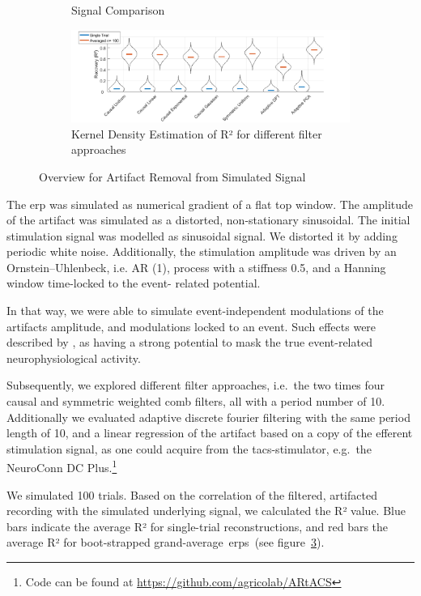 \documentclass[a4paper]{article}
\newcommand{\figref}[1]{(see figure~\ref{#1})}
\begin{document}
\begin{figure}[hbtp]
\begin{subfigure}{0.75\textwidth}
\begin{subfigure}{.45\textwidth}
        \end{subfigure}
    \caption{Signal Comparison}\label{fig:simRaw}
    \end{subfigure}
    \begin{subfigure}{1.0\textwidth}
        \includegraphics[width=\textwidth]{img/eva/sim_R2.png}
        \caption{Kernel Density Estimation of R² for different filter approaches}\label{fig:simR2}
    \end{subfigure}
    \caption{Overview for Artifact Removal from  Simulated Signal}
\end{figure}


The \gls{erp} was simulated as numerical gradient of a flat top window.
The amplitude of the artifact was simulated as a distorted, non-stationary sinusoidal. The initial stimulation signal was modelled as sinusoidal signal. We distorted it by adding periodic white noise. Additionally, the stimulation amplitude was driven by an Ornstein–Uhlenbeck, i.e. AR (1), process with a stiffness 0.5, and a Hanning window time-locked to the event- related potential.

In that way, we were able to simulate event-independent modulations of the artifacts amplitude, and modulations locked to an event. Such effects were described by \citep{Noury_2016}, as having a strong potential to mask the true event-related neurophysiological activity.

Subsequently, we explored different filter approaches, i.e.\ the two times four causal and symmetric weighted comb filters, all with a period number of 10. Additionally we evaluated adaptive discrete fourier filtering with the same period length of 10, and a linear regression of the artifact based on a copy of the efferent stimulation signal, as one could acquire from the \gls{tacs}-stimulator, e.g.\ the NeuroConn DC Plus.\footnote{Code can be found at \url{https://github.com/agricolab/ARtACS}}

We simulated 100 trials. Based on  the correlation of the filtered, artifacted recording with the simulated underlying signal, we calculated the R² value. Blue bars indicate the average R² for single-trial reconstructions, and red bars the average R² for boot-strapped grand-average~\gls{erp}s~\figref{fig:simR2}.
\end{document}
